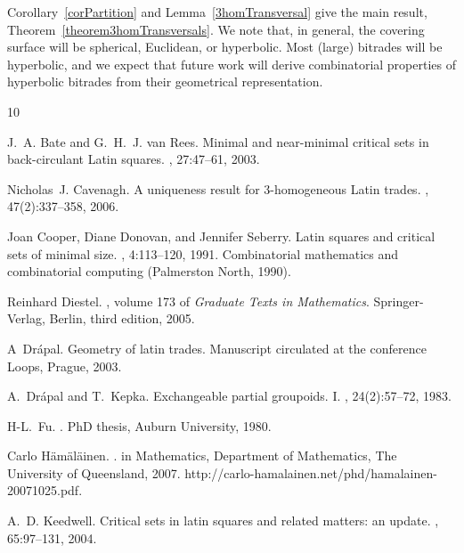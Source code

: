 \documentclass[amstags,fleqn,reqno]{article}
\theoremstyle{plain}
\theoremstyle{definition}
\begin{document}
Corollary~\ref{corPartition} and Lemma~\ref{3homTransversal} give the
main result, Theorem~\ref{theorem3homTransversals}.
We note that, in general,
the covering surface
will be spherical, Euclidean, or hyperbolic. Most (large) bitrades will be
hyperbolic, and we expect that future work will derive combinatorial
properties of hyperbolic bitrades from their geometrical representation.

%
%

\begin{thebibliography}{10}

J.~A. Bate and G.~H.~J. van Rees.
\newblock Minimal and near-minimal critical sets in back-circulant {L}atin
  squares.
, 27:47--61, 2003.

Nicholas~J. Cavenagh.
\newblock A uniqueness result for 3-homogeneous {L}atin trades.
, 47(2):337--358, 2006.

Joan Cooper, Diane Donovan, and Jennifer Seberry.
\newblock Latin squares and critical sets of minimal size.
, 4:113--120, 1991.
\newblock Combinatorial mathematics and combinatorial computing (Palmerston
  North, 1990).

Reinhard Diestel.
, volume 173 of {\em Graduate Texts in
  Mathematics}.
\newblock Springer-Verlag, Berlin, third edition, 2005.

A~Dr{\'a}pal.
\newblock Geometry of latin trades.
\newblock Manuscript circulated at the conference Loops, Prague, 2003.

A.~Dr{\'a}pal and T.~Kepka.
\newblock Exchangeable partial groupoids. {I}.
, 24(2):57--72, 1983.

H-L.\ Fu.
.
\newblock PhD thesis, Auburn University, 1980.

Carlo H\"{a}m\"{a}l\"{a}inen.
.
 in {M}athematics, Department of Mathematics, The University of
  Queensland, 2007.
\newblock http://carlo-hamalainen.net/phd/hamalainen-20071025.pdf.

A.~D. Keedwell.
\newblock Critical sets in latin squares and related matters: an update.
, 65:97--131, 2004.


\end{thebibliography}
\end{document}
